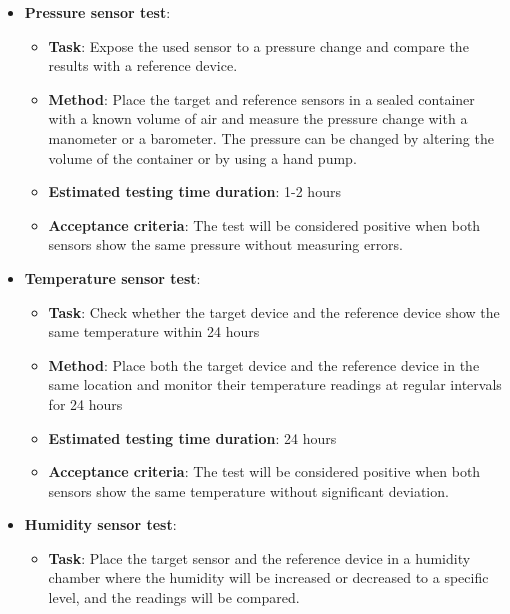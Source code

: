 \documentclass[11pt]{article}
\begin{document}
\begin{itemize}[labelwidth=0cm, leftmargin=0cm, itemindent=0.7cm, noitemsep, topsep=0pt, label={}]
\item \textbf{Pressure sensor test}:
\begin{itemize}[labelwidth=2cm, leftmargin=1.9cm, label=, noitemsep, topsep=2pt]
\item[\faTasks] \textbf{Task}: Expose the used sensor to a pressure change and compare the results with a reference device.
\item[\faFlask] \textbf{Method}: Place the target and reference sensors in a sealed container with a known volume of air and measure the pressure change with a manometer or a barometer. The pressure can be changed by altering the volume of the container or by using a hand pump.
\item[{\faHourglass[3]}] \textbf{Estimated testing time duration}: 1-2 hours
\item[{\faCheckSquare}] \textbf{Acceptance criteria}: The test will be considered positive when both sensors show the same pressure without measuring errors.
\end{itemize}
\item \textbf{Temperature sensor test}:
\begin{itemize}[labelwidth=2cm, leftmargin=1.9cm, label=, noitemsep, topsep=2pt]
\item[\faTasks] \textbf{Task}:  Check whether the target device and the reference device show the same temperature within 24 hours 
\item[\faFlask] \textbf{Method}: Place both the target device and the reference device in the same location and monitor their temperature readings at regular intervals for 24 hours
\item[{\faHourglass[3]}] \textbf{Estimated testing time duration}:  24 hours
\item[{\faCheckSquare}] \textbf{Acceptance criteria}: The test will be considered positive when both sensors show the same temperature without significant deviation.
\end{itemize}
\item \textbf{Humidity sensor test}:
\begin{itemize}[labelwidth=2cm, leftmargin=1.9cm, label=, noitemsep, topsep=2pt]
\item[\faTasks] \textbf{Task}:  Place the target sensor and the reference device in a humidity chamber where the humidity will be increased or decreased to a specific level, and the readings will be compared.

\end{itemize}
\end{itemize}
\end{document}
